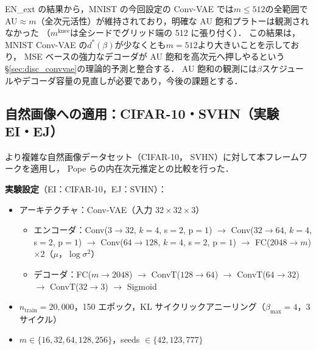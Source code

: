 \documentclass[11pt,a4paper]{jsarticle}
\newcommand{\mknee}{m^{\mathrm{knee}}}
\begin{document}
EN\_ext の結果から，MNIST の今回設定の Conv-VAE では$m \leq 512$の全範囲で
AU$\approx m$（全次元活性）が維持されており，明確な AU 飽和プラトーは観測されなかった
（$\mknee$は全シードでグリッド端の 512 に張り付く）．
この結果は，MNIST Conv-VAE の$d^*(\beta)$が少なくとも$m=512$より大きいことを示しており，
MSE ベースの強力なデコーダが AU 飽和を高次元へ押しやるという
§\ref{sec:disc_convvae}の理論的予測と整合する．
AU 飽和の観測には$\beta$スケジュールやデコーダ容量の見直しが必要であり，今後の課題とする．

\subsection{自然画像への適用：CIFAR-10・SVHN（実験 EI・EJ）}\label{sec:exp_natural}

より複雑な自然画像データセット（CIFAR-10\cite{krizhevsky2009learning}，
SVHN\cite{netzer2011reading}）に対して本フレームワークを適用し，
Pope ら\cite{pope2021intrinsic}の内在次元推定との比較を行った．

\textbf{実験設定}（EI：CIFAR-10，EJ：SVHN）：
\begin{itemize}
  \item アーキテクチャ：Conv-VAE（入力 $32 \times 32 \times 3$）
        \begin{itemize}
          \item エンコーダ：Conv($3\to32$, $k=4$, s$=2$, p$=1$) $\to$ Conv($32\to64$, $k=4$, s$=2$, p$=1$) $\to$
                Conv($64\to128$, $k=4$, s$=2$, p$=1$) $\to$ FC($2048 \to m$) $\times 2$（$\mu$，$\log\sigma^2$）
          \item デコーダ：FC($m \to 2048$) $\to$ ConvT($128\to64$) $\to$ ConvT($64\to32$) $\to$ ConvT($32\to3$) $\to$ Sigmoid
        \end{itemize}
  \item $n_{\mathrm{train}} = 20{,}000$，150 エポック，KL サイクリックアニーリング（$\beta_{\max}=4$，3サイクル）
  \item $m \in \{16, 32, 64, 128, 256\}$，seeds $\in \{42, 123, 777\}$
\end{itemize}
\end{document}
